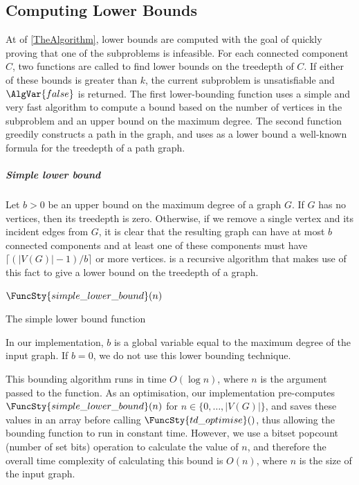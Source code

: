{    \subsection{Computing Lower Bounds}

    At  of \cref{TheAlgorithm},
    lower bounds are computed with the goal of quickly proving that one of the
    subproblems is infeasible.  For each connected component $C$, two functions are
    called to find lower bounds on the treedepth of $C$.  If either of these bounds
    is greater than $k$, the current subproblem is unsatisfiable and
    $\AlgVar{false}$ is returned.  The first lower-bounding function uses a simple and very fast
    algorithm to compute a bound based on the number of vertices in the subproblem
    and an upper bound on the maximum degree.  The second function greedily
    constructs a path in the graph, and uses as a lower bound a well-known formula for the treedepth of a
    path graph.

    \subparagraph*{Simple lower bound}

    Let $b > 0$ be an upper bound on the maximum degree of a graph $G$.
    If $G$ has no vertices, then its treedepth is zero.  Otherwise, if we remove a single vertex and
    its incident edges from $G$, it is clear that the resulting graph can
    have at most $b$ connected components and at least one of these components must have
    $\lceil (|V(G)| - 1) / b \rceil$ or more vertices.
     is a recursive algorithm that makes use of this
    fact to give a lower bound on the treedepth of a graph.

    {
    \begin{algorithm}[h!]
     \footnotesize
    \DontPrintSemicolon
    \newcommand\SimpleLowerBound{\FuncSty{simple\_lower\_bound}}
    \nl $\SimpleLowerBound(n)$ \label{simple_lower_bound_fun} \;
    \nl \Begin{
      \nl \lIf{$n = 0$}{\KwSty{return} $0$}
      \nl \KwSty{return} $1 + \SimpleLowerBound(\lceil (n - 1) / b \rceil )$ \;
    }
    \caption{The simple lower bound function}
    \label{SimpleLowerBoundAlgorithm}
    \end{algorithm}
    }

    In our implementation, $b$ is a global variable equal to the maximum degree of the
    input graph.  If $b = 0$, we do not use this lower bounding technique.

    This bounding algorithm runs in time $O(\log n)$, where $n$ is the argument passed
    to the function.
    As an optimisation, our implementation pre-computes $\FuncSty{simple\_lower\_bound}(n)$
    for $n \in \{0, \dots, |V(G)|\}$, and saves these values in an array before calling
    $\FuncSty{td\_optimise}()$, thus allowing the bounding function to run in constant time.
    However, we use a bitset popcount (number of set bits) operation to calculate the value of $n$, and therefore
    the overall time complexity of calculating this bound is $O(n)$, where $n$ is the size
    of the input graph.

}
